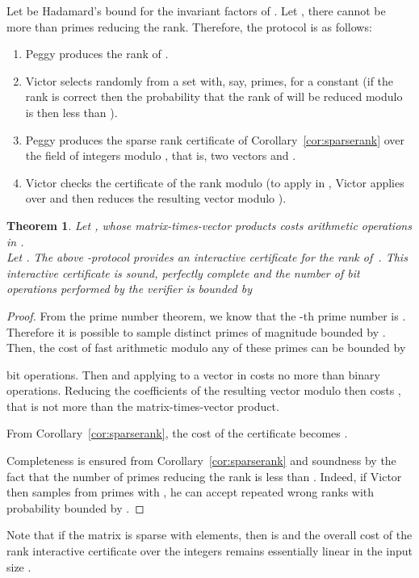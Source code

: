 \documentclass{article}
\newtheorem{theorem}{Theorem}
\begin{document}
 
Let  be
Hadamard's bound for the invariant factors of . Let , there
cannot be more than  primes reducing the 
rank. Therefore, the protocol is as follows:
\begin{enumerate}
\item Peggy produces the rank  of .
\item Victor selects  randomly from a set with, say,  primes, for a
  constant  (if the rank is correct then the probability that the rank of
   will be reduced modulo  is then less than ).
\item Peggy produces the sparse rank certificate of
  Corollary~\ref{cor:sparserank} over the field of integers modulo , that is,
  two vectors  and .
\item Victor checks the certificate of the rank modulo  (to apply  in
  , Victor applies  over  and then reduces the resulting vector
  modulo ).
\end{enumerate}

\begin{theorem}
  Let , whose matrix-times-vector products
  costs  arithmetic operations in .\\
   
  Let {\small }.
  The above -protocol provides an interactive certificate for the rank
  of~.
  This interactive certificate is sound, perfectly complete and the number of
  bit operations performed by the verifier is bounded by 
  
\end{theorem}
\begin{proof}
From  
the prime number theorem, we know that the -th prime number is 
. Therefore it is possible to sample  distinct primes of
magnitude bounded by . Then, the cost of fast arithmetic modulo
any of these primes can be bounded by

 
bit operations.
Then  and applying  to a vector in
 costs no more than  binary operations. Reducing the
coefficients of the resulting vector modulo  then costs
, that is not more than the
matrix-times-vector product. 
 
From  
Corollary~\ref{cor:sparserank}, the cost of the certificate becomes 
.  

Completeness is ensured from Corollary~\ref{cor:sparserank} and soundness by the
fact that the number of primes reducing the rank is less than . 
Indeed, if Victor then samples from  primes with , he can accept
 repeated wrong ranks with probability bounded by .
\end{proof}
Note that if the matrix is sparse with  elements, then 
 is  and the overall cost of the rank interactive
certificate over the integers remains essentially linear in 
the input size  
.  
\end{document}
